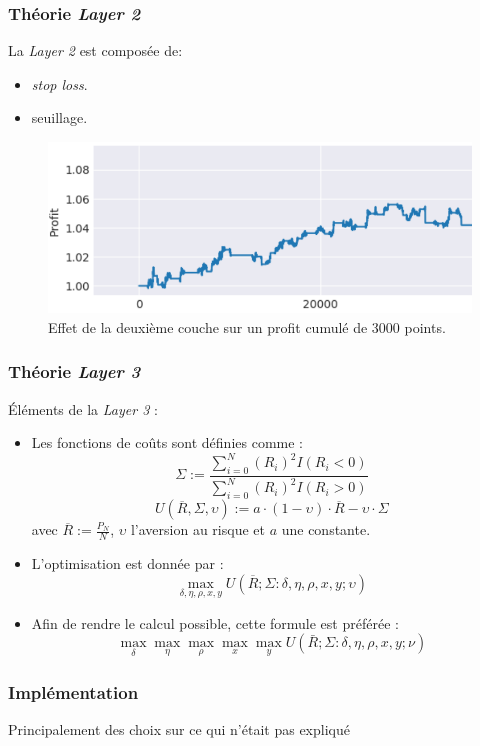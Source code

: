 \documentclass{beamer}
\begin{document}
	\begin{frame}
		\frametitle{Théorie \textit{Layer 2}}
		La \textit{Layer 2} est composée de:
		\begin{itemize}
			\item \textit{stop loss}.
			\item seuillage.
		\end{itemize}
		\begin{figure}
			\includegraphics[scale=0.4]{images/stop_loss}
			\caption{Effet de la deuxième couche sur un profit cumulé de 3000 points.}
		\end{figure}
	\end{frame}

	\begin{frame}
		\frametitle{Théorie \textit{Layer 3}}
		Éléments de la \textit{Layer 3} :
		\begin{itemize}
			\item Les fonctions de coûts sont définies comme : $$\Sigma := \frac{\sum_{i=0}^N (R_i)^2 I(R_i < 0)}{\sum_{i=0}^N (R_i)^2 I(R_i > 0)}$$
			$$ U(\overline{R},\Sigma,\upsilon) := a\cdot(1-\upsilon)\cdot \overline{R} - \upsilon \cdot \Sigma$$ avec $\overline{R} := \frac{P_N}{N}$, $\upsilon$ l'aversion au risque et $a$ une constante.
			\item L'optimisation est donnée par : $$\max_{\delta, \eta, \rho, x, y} U(\overline{R};\Sigma: \delta, \eta, \rho, x, y; \upsilon)$$
			\item Afin de rendre le calcul possible, cette formule est préférée : $$\max\limits_{\delta} \max\limits_{\eta} \max\limits_{\rho} \max\limits_{x} \max\limits_{y} U(\bar{R};\Sigma : \delta, \eta, \rho, x, y; \nu)$$
		\end{itemize}
	\end{frame}

	\begin{frame}
		\frametitle{Implémentation}
		Principalement des choix sur ce qui n'était pas expliqué
	\end{frame}
\end{document}
